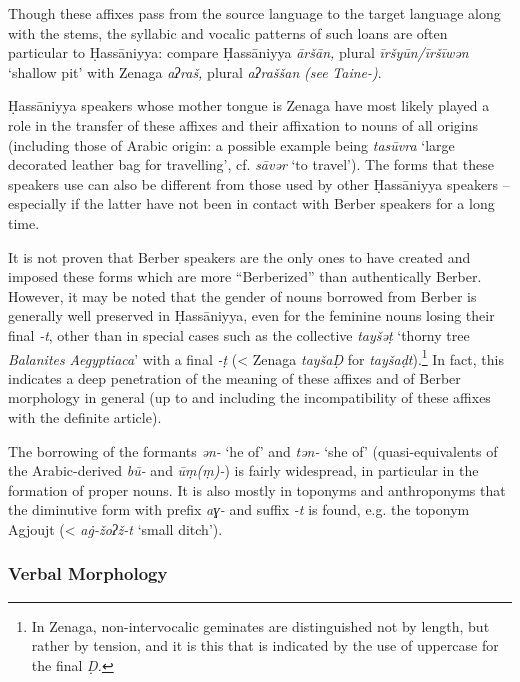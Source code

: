 \documentclass[output=paper]{langsci/langscibook}
\begin{document}
Though these affixes pass from the source language to the target language along with the stems, the syllabic and vocalic patterns of such loans are often particular to Ḥassāniyya: compare Ḥassāniyya \textit{āršān,} plural \textit{īršyūn/īršīwən} ‘shallow pit’ with Zenaga \textit{aʔraš,} plural \textit{aʔraššan} \textit{(see} \textit{Taine-\citealt{Cheikh1997a})}.

Ḥassāniyya speakers whose mother tongue is Zenaga have most likely played a role in the transfer of these affixes and their affixation to nouns of all origins (including those of Arabic origin: a possible example being \textit{tasūvra} ‘large decorated leather bag for travelling’, cf. \textit{sāvər} ‘to travel’). The forms that these speakers use can also be different from those used by other Ḥassāniyya speakers – especially if the latter have not been in contact with Berber speakers for a long time. 

It is not proven that Berber speakers are the only ones to have created and imposed these forms which are more “Berberized” than authentically Berber. However, it may be noted that the gender of nouns borrowed from Berber is generally well preserved in Ḥassāniyya, even for the feminine nouns losing their final \textit{{}-t}, other than in special cases such as the collective \textit{tayšəṭ} ‘thorny tree \textit{Balanites} \textit{Aegyptiaca}’ with a final \textit{{}-ṭ} (< Zenaga \textit{tayšaḌ} for \textit{tayšaḍt}).\footnote{In Zenaga, non-intervocalic geminates are distinguished not by length, but rather by tension, and it is this that is indicated by the use of uppercase for the final \textit{Ḍ.} } In fact, this indicates a deep penetration of the meaning of these affixes and of Berber morphology in general (up to and including the incompatibility of these affixes with the definite article). 

The borrowing of the formants \textit{ən-} ‘he of’ and \textit{tən-} ‘she of’ (quasi-equivalents of the Arabic-derived \textit{bū-} and \textit{ūṃ(ṃ)-}) is fairly widespread, in particular in the formation of proper nouns. It is also mostly in toponyms and anthroponyms that the diminutive form with prefix \textit{aɣ-} and suffix \textit{{}-t} is found, e.g. the toponym Agjoujt (< \textit{a\.g-žoʔž-t} ‘small ditch’).

\subsubsection{ Verbal Morphology} %
\end{document}

